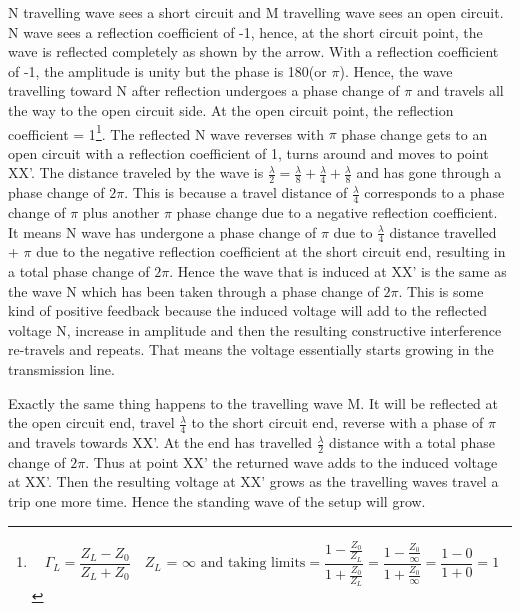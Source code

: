  N travelling wave sees a short circuit and M travelling wave sees an open circuit. N wave sees a reflection coefficient of -1, hence, at the short circuit point, the wave is reflected completely as shown by the arrow. With a reflection coefficient of -1, the amplitude is unity but the phase is 180\textdegree (or $\pi$). Hence, the wave travelling toward N after reflection undergoes a phase change of $\pi$ and travels all the way to the open circuit side. At the open circuit point, the reflection coefficient = 1\footnote{
\begin{dmath*}
\Gamma_{L} = \frac{Z_{L} - Z_0}{Z_{L} + Z_0}\quad Z_{L}\text{ = }\infty\text{ and taking limits}
= \frac{1 - \frac{Z_0}{Z_{L}}}{1 + \frac{Z_0}{Z_{L}}}
= \frac{1 - \frac{Z_0}\infty}{1 + \frac{Z_0}\infty}
= \frac{1 - 0}{1 + 0}
= 1
\end{dmath*}
}. The reflected N wave reverses with $\pi$ phase change gets to an open circuit with a reflection coefficient of 1, turns around and moves to point XX'. The distance traveled by the wave is $ \frac{\lambda}{2} = \frac{\lambda}{8} + \frac{\lambda}{4} + \frac{\lambda}{8}$ and has gone through a phase change of $2\pi$. This is because a travel distance of $\frac{\lambda}{4}$ corresponds to a phase change of $\pi$ plus another $\pi$ phase change due to a negative reflection coefficient. It means N wave has undergone a phase change of $\pi$ due to $\frac{\lambda }{4}$ distance travelled + $\pi$ due to the negative reflection coefficient at the short circuit end, resulting in a total phase change of $2\pi$. Hence the wave that is induced at XX' is the same as the wave N which has been taken through a phase change of $2\pi$. This is some kind of positive feedback because the induced voltage will add to the reflected voltage N, increase in amplitude and then the resulting constructive interference re-travels and repeats. That means the voltage essentially starts growing in the transmission line.

Exactly the same thing happens to the travelling wave M. It will be reflected at the open circuit end, travel $\frac{\lambda}{4}$ to the short circuit end, reverse with a phase of $\pi$ and travels towards XX'. At the end has travelled $\frac{\lambda }{2}$ distance with a total phase change of $2\pi$. Thus at point XX' the returned wave adds to the induced voltage at XX'. Then the resulting voltage at XX' grows as the travelling waves travel a trip one more time. Hence the standing wave of the setup will grow.

